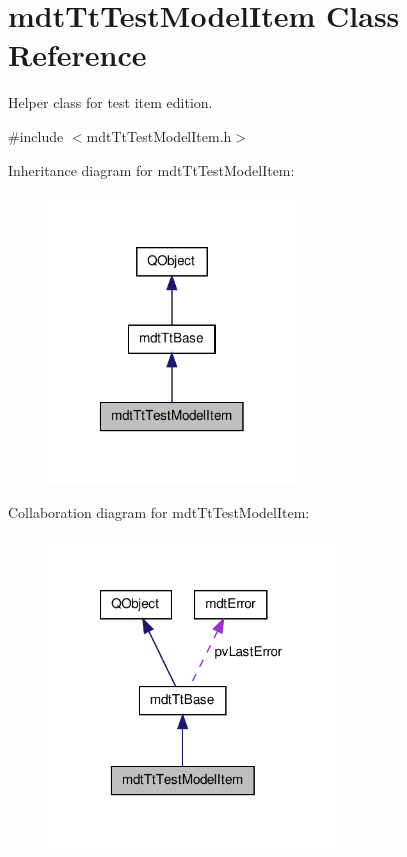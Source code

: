 \hypertarget{classmdt_tt_test_model_item}{\section{mdt\-Tt\-Test\-Model\-Item Class Reference}
\label{classmdt_tt_test_model_item}
}


Helper class for test item edition.  




{\ttfamily \#include $<$mdt\-Tt\-Test\-Model\-Item.\-h$>$}



Inheritance diagram for mdt\-Tt\-Test\-Model\-Item\-:\nopagebreak
\begin{figure}[H]
\begin{center}
\leavevmode
\includegraphics[width=186pt]{classmdt_tt_test_model_item__inherit__graph}
\end{center}
\end{figure}


Collaboration diagram for mdt\-Tt\-Test\-Model\-Item\-:\nopagebreak
\begin{figure}[H]
\begin{center}
\leavevmode
\includegraphics[width=216pt]{classmdt_tt_test_model_item__coll__graph}
\end{center}
\end{figure}
